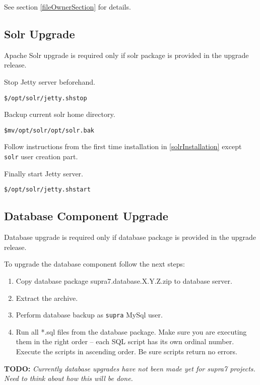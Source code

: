 \documentclass[12pt]{article}
\newcommand{\vigShowNotes}{1}
\newcommand{\vigPackageName}{supra7}
\newcommand{\vigReleaseVersion}{X.Y.Z}
\newcommand{\todo}[1]{
\textbf{TODO:} 
\textit{#1}
}
\begin{document}
See section \ref{fileOwnerSection} for details.

\subsection{Solr Upgrade}

Apache Solr upgrade is required only if solr package is provided in the upgrade release.

Stop Jetty server beforehand.

\begin{alltt}
\$ /opt/solr/jetty.sh stop
\end{alltt}

Backup current solr home directory.

\begin{alltt}
\$ mv /opt/solr /opt/solr.bak
\end{alltt}

Follow instructions from the first time installation in \ref{solrInstallation} except \texttt{solr} user creation part.

Finally start Jetty server.

\begin{alltt}
\$ /opt/solr/jetty.sh start
\end{alltt}

\subsection{Database Component Upgrade}

Database upgrade is required only if database package is provided in the upgrade release.

To upgrade the database component follow the next steps:

\begin{enumerate}
	\item Copy database package {\vigPackageName}.database.\vigReleaseVersion.zip to database server.
	\item Extract the archive.
	\item Perform database backup as \texttt{supra} MySql user.
	\item Run all *.sql files from the database package. Make sure you are executing them in the right order -- each SQL script has its own ordinal number. Execute the scripts in ascending order. Be sure scripts return no errors.
\end{enumerate}

\todo{Currently database upgrades have not been made yet for supra7 projects. Need to think about how this will be done.}
\end{document}
